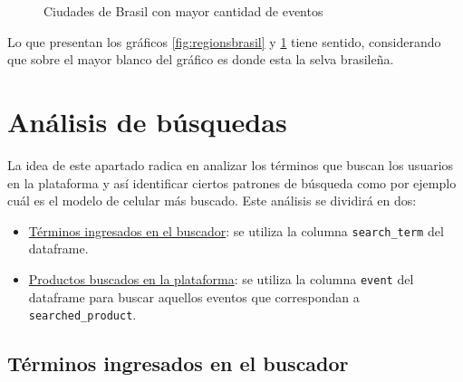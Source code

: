 \documentclass[a4paper]{article}
\begin{document}
\begin{figure}[h!]
	\caption{Ciudades de Brasil con mayor cantidad de eventos}
	\label{fig:citybrasil}
\end{figure}

Lo que presentan los gráficos \ref{fig:regionsbrasil} y \ref{fig:citybrasil} tiene sentido, considerando que sobre el mayor blanco del gráfico es donde esta la selva brasileña.

\section{Análisis de búsquedas} \label{busq}

La idea de este apartado radica en analizar los términos que buscan los usuarios en la plataforma y así identificar ciertos patrones de búsqueda como por ejemplo cuál es el modelo de celular más buscado. Este análisis se dividirá en dos:

\begin{itemize}
	\item \underline{Términos ingresados en el buscador}: se utiliza la columna \texttt{search\_term} del dataframe.
	\item \underline{Productos buscados en la plataforma}: se utiliza la columna \texttt{event} del dataframe para buscar aquellos eventos que correspondan a \texttt{searched\_product}.
 \end{itemize}

\subsection{Términos ingresados en el buscador}
\end{document}
